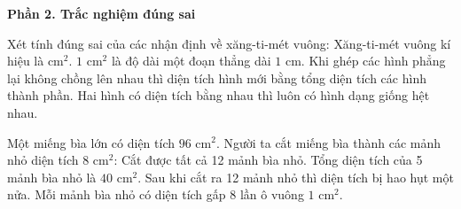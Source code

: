 \textbf{Phần 2. Trắc nghiệm đúng sai}

\begin{ex} %
Xét tính đúng sai của các nhận định về xăng-ti-mét vuông:
\choiceTF
{\True Xăng-ti-mét vuông kí hiệu là $\text{cm}^2$.}
{$1\text{ cm}^2$ là độ dài một đoạn thẳng dài $1\text{ cm}$.}
{\True Khi ghép các hình phẳng lại không chồng lên nhau thì diện tích hình mới bằng tổng diện tích các hình thành phần.}
{Hai hình có diện tích bằng nhau thì luôn có hình dạng giống hệt nhau.}
\end{ex}

\begin{ex} %
Một miếng bìa lớn có diện tích $96\text{ cm}^2$. Người ta cắt miếng bìa thành các mảnh nhỏ diện tích $8\text{ cm}^2$:
\choiceTF
{\True Cắt được tất cả 12 mảnh bìa nhỏ.}
{\True Tổng diện tích của 5 mảnh bìa nhỏ là $40\text{ cm}^2$.}
{Sau khi cắt ra 12 mảnh nhỏ thì diện tích bị hao hụt một nửa.}
{\True Mỗi mảnh bìa nhỏ có diện tích gấp 8 lần ô vuông $1\text{ cm}^2$.}
\end{ex}

